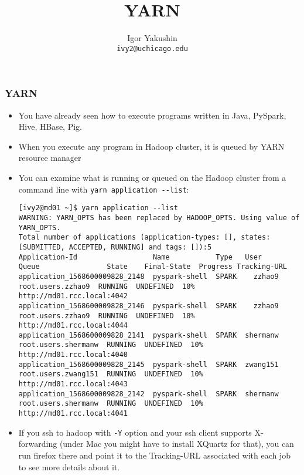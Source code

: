 \documentclass{beamer}
\title{\huge{YARN}}
\author{Igor Yakushin \\ \texttt{ivy2@uchicago.edu}}
\date{}
\begin{document}



\begin{frame}
\titlepage
\end{frame}


\begin{frame}[fragile]
  \frametitle{YARN}
  \begin{itemize}
  \item You have already seen how to execute programs written in Java, PySpark, Hive, HBase, Pig.
  \item When you execute any program in Hadoop cluster, it is queued by YARN resource manager
  \item You can examine what is running or queued on the Hadoop cluster from a command line
    with {\color{mycolorcli}\verb|yarn application --list|}:
    {\fontsize{4}{6}

      {\color{mycolorcli}
\begin{verbatim}
[ivy2@md01 ~]$ yarn application --list
WARNING: YARN_OPTS has been replaced by HADOOP_OPTS. Using value of YARN_OPTS.
Total number of applications (application-types: [], states: [SUBMITTED, ACCEPTED, RUNNING] and tags: []):5
Application-Id                  Name           Type   User       Queue                State    Final-State  Progress Tracking-URL
application_1568600009828_2148  pyspark-shell  SPARK    zzhao9     root.users.zzhao9  RUNNING  UNDEFINED  10%  http://md01.rcc.local:4042
application_1568600009828_2146  pyspark-shell  SPARK    zzhao9     root.users.zzhao9  RUNNING  UNDEFINED  10%  http://md01.rcc.local:4044
application_1568600009828_2141  pyspark-shell  SPARK  shermanw   root.users.shermanw  RUNNING  UNDEFINED  10%  http://md01.rcc.local:4040
application_1568600009828_2145  pyspark-shell  SPARK  zwang151   root.users.zwang151  RUNNING  UNDEFINED  10%  http://md01.rcc.local:4043
application_1568600009828_2142  pyspark-shell  SPARK  shermanw   root.users.shermanw  RUNNING  UNDEFINED  10%  http://md01.rcc.local:4041
\end{verbatim}
      }
    }
  \item If you ssh to hadoop with \verb|-Y| option and your ssh client supports X-forwarding
    (under Mac you might have to install XQuartz for that),
    you can run firefox there and point it to the Tracking-URL associated with each job to see more details
    about it.
  \end{itemize}
\end{frame}
\end{document}
